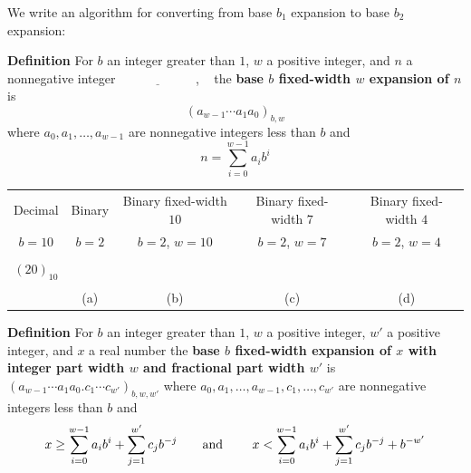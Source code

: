 \documentclass[12pt, oneside]{article}
\begin{document}
 
We write an algorithm for converting from base $b_1$ expansion to base $b_2$ expansion:

\phantom{
Earlier, we saw (two different) algorithms for, given 
a target base $b$, converting from decimal to base $b$ expansions. 
We will use either one of these as a subroutine in this algorithm.\\
Given a base expansion in base $b_1$:\\
Step 1: Use the definition of base expansion to calculate the value of
    this number (in decimal).\\
Step 2: Use the Least Significant First algorithm to write this value in 
    base $b_2$ and output the result.
}
\vspace{200pt} 

{\bf Definition} For $b$ an integer greater than $1$, $w$ a positive integer, 
and $n$ a nonnegative integer
$\underline{\phantom{\hspace{1in}}}$, ~
the {\bf base $b$ fixed-width $w$ expansion of $n$}  is
\[
(a_{w-1} \cdots a_1 a_0)_{b,w}
\]
where  $a_0, a_1, \ldots, a_{w-1}$ are nonnegative integers less than $b$ and
\[
n =  \sum_{i=0}^{w-1} a_{i} b^{i}
\]
 

\begin{center}
    \begin{tabular}{|c|c|c|c|c|}
    \hline
    Decimal &  Binary  & Binary fixed-width $10$& Binary fixed-width $7$ & Binary fixed-width $4$\\
    $b=10$ & $b=2$ & $b=2$, $w =  10$& $b=2$, $w =  7$& $b=2$, $w =  4$ \\
    \hline 
    &&&&  \\
    $(20)_{10}$&\phantom{$(10100)_{2}$\qquad\qquad}&&  &\\
    &&&&  \\
    &(a)&(b)&(c)&(d)  \\
    \hline
    \end{tabular}
    \end{center}
 

{\bf Definition} For $b$ an integer greater than $1$, $w$ a positive integer, 
$w'$ a positive  integer, and $x$ a real number the {\bf base $b$ fixed-width 
expansion of $x$ with integer part width $w$  and fractional part width $w'$} is
$(a_{w-1} \cdots a_1 a_0 .  c_{1} \cdots c_{w'})_{b,w,w'}$
where  $a_0, a_1, \ldots, a_{w-1}, c_1, \ldots, c_{w'}$ are nonnegative integers less than $b$ and
$$x \geq \sum_{i=0}^{w-1} a_{i} b^{i} + \sum_{j=1}^{w'}  c_{j} b^{-j} \hfill
\textrm{\qquad and \qquad}
\hfill x < \sum_{i=0}^{w-1} a_{i} b^{i} + \sum_{j=1}^{w'} c_{j} b^{-j} + b^{-w'}$$
\end{document}
